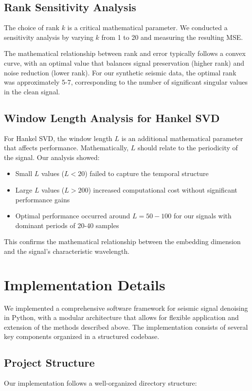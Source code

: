 \documentclass[10pt,twocolumn]{article}
\begin{document}
\subsection{Rank Sensitivity Analysis}
The choice of rank $k$ is a critical mathematical parameter. We conducted a sensitivity analysis by varying $k$ from 1 to 20 and measuring the resulting MSE.

The mathematical relationship between rank and error typically follows a convex curve, with an optimal value that balances signal preservation (higher rank) and noise reduction (lower rank). For our synthetic seismic data, the optimal rank was approximately 5-7, corresponding to the number of significant singular values in the clean signal.

\subsection{Window Length Analysis for Hankel SVD}
For Hankel SVD, the window length $L$ is an additional mathematical parameter that affects performance. Mathematically, $L$ should relate to the periodicity of the signal. Our analysis showed:

\begin{itemize}
\item Small $L$ values ($L < 20$) failed to capture the temporal structure
\item Large $L$ values ($L > 200$) increased computational cost without significant performance gains
\item Optimal performance occurred around $L = 50-100$ for our signals with dominant periods of 20-40 samples
\end{itemize}

This confirms the mathematical relationship between the embedding dimension and the signal's characteristic wavelength.

\section{Implementation Details}
We implemented a comprehensive software framework for seismic signal denoising in Python, with a modular architecture that allows for flexible application and extension of the methods described above. The implementation consists of several key components organized in a structured codebase.

\subsection{Project Structure}
Our implementation follows a well-organized directory structure:
\end{document}
